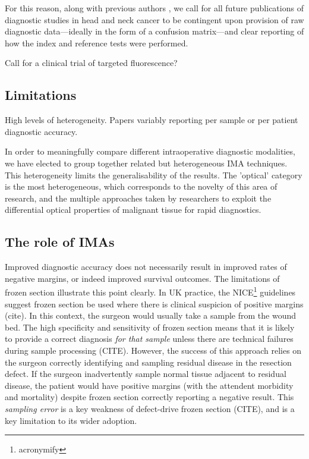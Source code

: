 For this reason, along with previous authors \cite{stjohnDiagnosticAccuracyIntraoperative2017, irwigGuidelinesMetaanalysesEvaluating1994}, we call for all future publications of diagnostic studies in head and neck cancer to be contingent upon provision of raw diagnostic data---ideally in the form of a confusion matrix---and clear reporting of how the index and reference tests were performed.

Call for a clinical trial of targeted fluorescence?

\subsection{Limitations}

High levels of heterogeneity.
Papers variably reporting per sample or per patient diagnostic accuracy.

In order to meaningfully compare different intraoperative diagnostic modalities, we have elected to group together related but heterogeneous IMA techniques. 
This heterogeneity limits the generalisability of the results.
The 'optical' category is the most heterogeneous, which corresponds to the novelty of this area of research, and the multiple approaches taken by researchers to exploit the differential optical properties of malignant tissue for rapid diagnostics.


\subsection{The role of IMAs}

Improved diagnostic accuracy does not necessarily result in improved rates of negative margins, or indeed improved survival outcomes.
The limitations of frozen section illustrate this point clearly.
In UK practice, the NICE\footnote{acronymify} guidelines suggest frozen section be used where there is clinical suspicion of positive margins (cite).
In this context, the surgeon would usually take a sample from the wound bed.
The high specificity and sensitivity of frozen section means that it is likely to provide a correct diagnosis \textit{for that sample} unless there are technical failures during sample processing (CITE).
However, the success of this approach relies on the surgeon correctly identifying and sampling residual disease in the resection defect. 
If the surgeon inadvertently sample normal tissue adjacent to residual disease, the patient would have positive margins (with the attendent morbidity and mortality) despite frozen section correctly reporting a negative result.
This \textit{sampling error} is a key weakness of defect-drive frozen section (CITE), and is a key limitation to its wider adoption.

